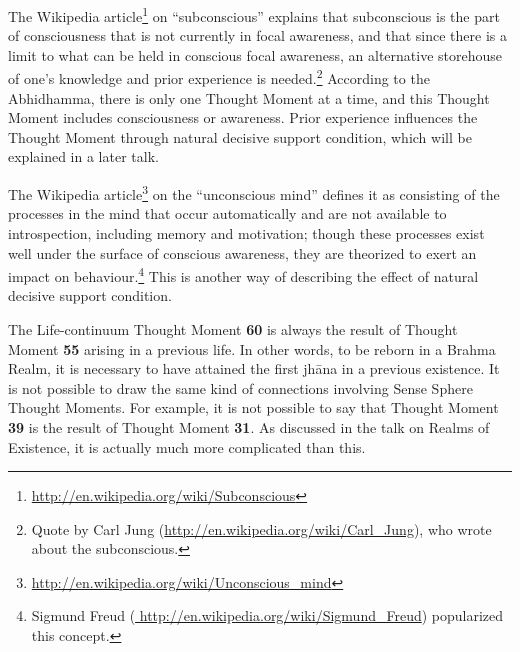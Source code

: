 The Wikipedia article\footnote{\url{http://en.wikipedia.org/wiki/Subconscious}} on “subconscious” explains that subconscious is the part of consciousness that is not currently in focal awareness, and that since there is a limit to what can be held in conscious focal awareness, an alternative storehouse of one’s knowledge and prior experience is needed.\footnote{Quote by Carl Jung (\url{http://en.wikipedia.org/wiki/Carl_Jung}), who wrote about the subconscious.} According to the Abhidhamma, there is only one Thought Moment at a time, and this Thought Moment includes consciousness or awareness. Prior experience influences the Thought Moment through natural decisive support condition, which will be explained in a later talk.

The Wikipedia article\footnote{\url{ http://en.wikipedia.org/wiki/Unconscious_mind}} on the “unconscious mind” defines it as consisting of the processes in the mind that occur automatically and are not available to introspection, including memory and motivation; though these processes exist well under the surface of conscious awareness, they are theorized to exert an impact on behaviour.\footnote{Sigmund Freud (\url{ http://en.wikipedia.org/wiki/Sigmund_Freud}) popularized this concept.} This is another way of describing the effect of natural decisive support condition.


The Life-continuum Thought Moment \textbf{60} is always the result of Thought Moment \textbf{55} arising in a previous life. In other words, to be reborn in a Brahma Realm, it is necessary to have attained the first jhāna in a previous existence. It is not possible to draw the same kind of connections involving Sense Sphere Thought Moments. For example, it is not possible to say that Thought Moment \textbf{39} is the result of Thought Moment \textbf{31}. As discussed in the talk on Realms of Existence, it is actually much more complicated than this.
